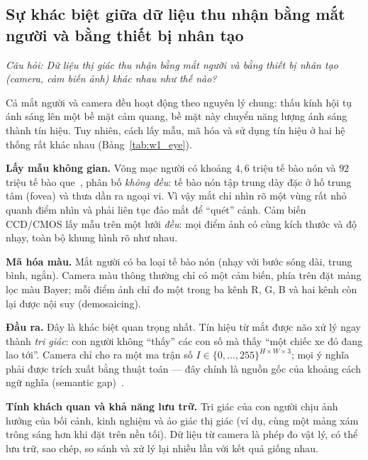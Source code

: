 \subsection{Sự khác biệt giữa dữ liệu thu nhận bằng mắt người và bằng thiết bị nhân tạo}
\label{subsec:w1_eye}

\textit{Câu hỏi: Dữ liệu thị giác thu nhận bằng mắt người và bằng thiết bị nhân tạo (camera, cảm biến ảnh) khác nhau như thế nào?}

Cả mắt người và camera đều hoạt động theo nguyên lý chung: thấu kính hội tụ ánh sáng lên một bề mặt cảm quang, bề mặt này chuyển năng lượng ánh sáng thành tín hiệu. Tuy nhiên, cách lấy mẫu, mã hóa và sử dụng tín hiệu ở hai hệ thống rất khác nhau (Bảng~\ref{tab:w1_eye}).

\textbf{Lấy mẫu không gian.} Võng mạc người có khoảng $4{,}6$ triệu tế bào nón và $92$ triệu tế bào que~\citep{curcio1990human}, phân bố \emph{không đều}: tế bào nón tập trung dày đặc ở hố trung tâm (fovea) và thưa dần ra ngoại vi. Vì vậy mắt chỉ nhìn rõ một vùng rất nhỏ quanh điểm nhìn và phải liên tục đảo mắt để ``quét'' cảnh. Cảm biến CCD/CMOS lấy mẫu trên một lưới \emph{đều}: mọi điểm ảnh có cùng kích thước và độ nhạy, toàn bộ khung hình rõ như nhau.

\textbf{Mã hóa màu.} Mắt người có ba loại tế bào nón (nhạy với bước sóng dài, trung bình, ngắn). Camera màu thông thường chỉ có một cảm biến, phía trên đặt mảng lọc màu Bayer; mỗi điểm ảnh chỉ đo một trong ba kênh R, G, B và hai kênh còn lại được nội suy (demosaicing).

\textbf{Đầu ra.} Đây là khác biệt quan trọng nhất. Tín hiệu từ mắt được não xử lý ngay thành \emph{tri giác}: con người không ``thấy'' các con số mà thấy ``một chiếc xe đỏ đang lao tới''. Camera chỉ cho ra một ma trận số $I \in \{0, \ldots, 255\}^{H \times W \times 3}$; mọi ý nghĩa phải được trích xuất bằng thuật toán — đây chính là nguồn gốc của khoảng cách ngữ nghĩa (semantic gap)~\citep{smeulders2000content}.

\textbf{Tính khách quan và khả năng lưu trữ.} Tri giác của con người chịu ảnh hưởng của bối cảnh, kinh nghiệm và ảo giác thị giác (ví dụ, cùng một mảng xám trông sáng hơn khi đặt trên nền tối). Dữ liệu từ camera là phép đo vật lý, có thể lưu trữ, sao chép, so sánh và xử lý lại nhiều lần với kết quả giống nhau.

